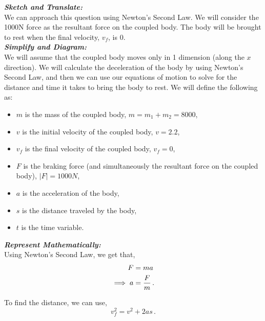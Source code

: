 \begin{subquestions}
\begin{subsubquestions}

\subsubquestion

\textbf{\textit{Sketch and Translate:}} \\
We can approach this question using Newton's Second Law. We will consider the 1000N force as the resultant force on the coupled body. The body will be brought to rest when the final velocity, $v_f$, is 0.\\




\textbf{\textit{Simplify and Diagram:}} \\
We will assume that the coupled body moves only in 1 dimension (along the $x$ direction). We will calculate the deceleration of the body by using Newton's Second Law, and then we can use our equations of motion to solve for the distance and time it takes to bring the body to rest. We will define the following as:
\begin{itemize}
	\item $m$ is the mass of the coupled body, $m=m_1+m_2=8000$,
	\item $v$ is the initial velocity of the coupled body, $v=2.2$,
	\item $v_f$ is the final velocity of the coupled body, $v_f=0$,
	\item $F$ is the braking force (and simultaneously the resultant force on the coupled body), $|F|=1000N$,
	\item $a$ is the acceleration of the body,
	\item $s$ is the distance traveled by the body,
	\item $t$ is the time variable.
\end{itemize}



\textbf{\textit{Represent Mathematically:}} \\ 
Using Newton's Second Law, we get that,
\begin{align}
	F & = ma \nonumber \\
	\implies a & = \frac{F}{m} \label{2008J:q5:AEqn1} \,.
\end{align}

To find the distance, we can use,
\begin{equation}
	v_f^2 = v^2 + 2as \label{2008J:q5:SEqn1} \,.
\end{equation}


\end{subsubquestions}
\end{subquestions}
